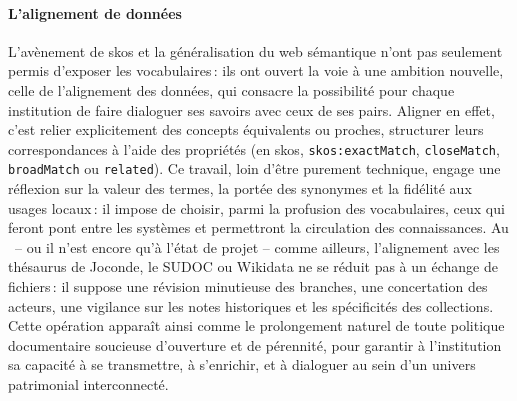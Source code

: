 \paragraph*{L'alignement de données}
L’avènement de \gls{skos} et la généralisation du web sémantique n’ont pas seulement permis d’exposer les vocabulaires : ils ont ouvert la voie à une ambition nouvelle, celle de l’alignement des données, qui consacre la possibilité pour chaque institution de faire dialoguer ses savoirs avec ceux de ses pairs. Aligner en effet, c'est relier explicitement des concepts équivalents ou proches, structurer leurs correspondances à l’aide des propriétés (en \ac{skos}, \lstinline|skos:exactMatch|, \lstinline|closeMatch|, \lstinline|broadMatch| ou \lstinline|related|). Ce travail, loin d’être purement technique, engage une réflexion sur la valeur des termes, la portée des synonymes et la fidélité aux usages locaux : il impose de choisir, parmi la profusion des vocabulaires, ceux qui feront pont entre les systèmes et permettront la circulation des connaissances. Au \mae~-- ou il n'est encore qu'à l'état de projet -- comme ailleurs, l’alignement avec les thésaurus de Joconde, le SUDOC ou Wikidata ne se réduit pas à un échange de fichiers : il suppose une révision minutieuse des branches, une concertation des acteurs, une vigilance sur les notes historiques et les spécificités des collections. Cette opération apparaît ainsi comme le prolongement naturel de toute politique documentaire soucieuse d’ouverture et de pérennité, pour garantir à l'institution sa capacité à se transmettre, à s’enrichir, et à dialoguer au sein d’un univers patrimonial interconnecté.